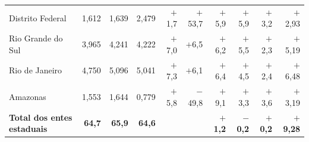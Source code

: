 \begin{longtable}{@{}>{\raggedright\arraybackslash}p{3.0cm}*{9}{r}@{}}
Distrito Federal & 1,612 & 1,639 & 2,479 & $+$1,7 & $+$53,7 & $+$5,9 & $+$5,9 & $+$3,2 & $+$2,93 \\
Rio Grande do Sul & 3,965 & 4,241 & 4,222 & $+$7,0 & $+$6,5 & $+$6,2 & $+$5,5 & $+$2,3 & $+$5,19 \\
Rio de Janeiro & 4,750 & 5,096 & 5,041 & $+$7,3 & $+$6,1 & $+$6,4 & $+$4,5 & $+$2,4 & $+$6,48 \\
Amazonas & 1,553 & 1,644 & 0,779 & $+$5,8 & $-$49,8 & $+$9,1 & $+$3,3 & $+$3,6 & $+$3,19 \\
\midrule
\textbf{Total dos entes estaduais} & \textbf{64,7} & \textbf{65,9} & \textbf{64,6} & & & \textbf{$+$1,2} & \textbf{$-$0,2} & \textbf{$+$0,2} & \textbf{$+$9,28} \\
\end{longtable}
\addtocounter{table}{-1}
